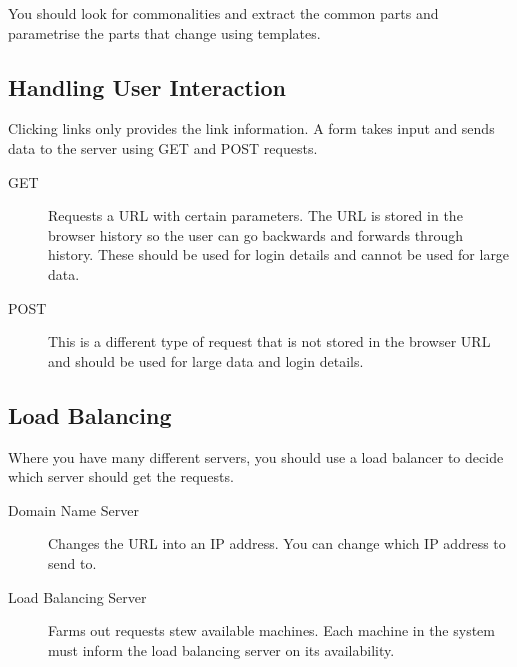 You should look for commonalities and extract the common parts and parametrise the parts that change using templates.

\subsection{Handling User Interaction}\label{sub:handling_user_interaction}

Clicking links only provides the link information.
A form takes input and sends data to the server using GET and POST requests.

\begin{description}
	\item[GET] Requests a URL with certain parameters.
	      The URL is stored in the browser history so the user can go backwards and forwards through history.
	      These should be used for login details and cannot be used for large data.
	\item[POST] This is a different type of request that is not stored in the browser URL and should be used for large data and login details.
\end{description}

\subsection{Load Balancing}\label{sub:load_balancing}

Where you have many different servers, you should use a load balancer to decide which server should get the requests.
\begin{description}
	\item[Domain Name Server] Changes the URL into an IP address.
	      You can change which IP address to send to.
	\item[Load Balancing Server] Farms out requests stew available machines.
	      Each machine in the system must inform the load balancing server on its availability.
\end{description}
